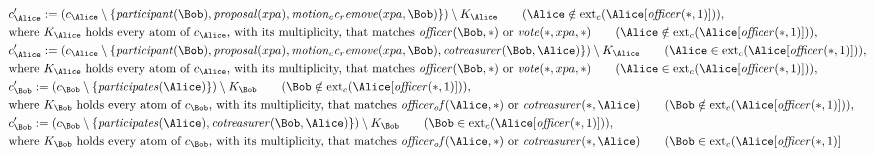 \begin{align*}
&
c'_
{
\Alice
}
 := 
(c_
{
\Alice
}
 \setminus 
\{
\mathit{
participant
}
(
\Bob
)
,
\mathit{
proposal
}
(
xpa
)
,
\mathit{
motion_cc_remove
}
(
xpa
,
\Bob
)
\}
) \setminus K_
{
\Alice
}
 \qquad (
\Alice
 \notin 
\mathrm{ext}_c(
\Alice
[
\mathit{
officer
}
(
\ast
,
1
)
]
)
)
,\\
&
\text{where } K_
{
\Alice
}
 \text{ holds every atom of } c_
{
\Alice
}
 \text{, with its multiplicity, that matches } 
\mathit{
officer
}
(
\Bob
,
\ast
)
 \text{ or } 
\mathit{
vote
}
(
\ast
,
xpa
,
\ast
)
 \qquad (
\Alice
 \notin 
\mathrm{ext}_c(
\Alice
[
\mathit{
officer
}
(
\ast
,
1
)
]
)
)
,\\
&
c'_
{
\Alice
}
 := 
(c_
{
\Alice
}
 \setminus 
\{
\mathit{
participant
}
(
\Bob
)
,
\mathit{
proposal
}
(
xpa
)
,
\mathit{
motion_cc_remove
}
(
xpa
,
\Bob
)
,
\mathit{
cotreasurer
}
(
\Bob
,
\Alice
)
\}
) \setminus K_
{
\Alice
}
 \qquad (
\Alice
 \in 
\mathrm{ext}_c(
\Alice
[
\mathit{
officer
}
(
\ast
,
1
)
]
)
)
,\\
&
\text{where } K_
{
\Alice
}
 \text{ holds every atom of } c_
{
\Alice
}
 \text{, with its multiplicity, that matches } 
\mathit{
officer
}
(
\Bob
,
\ast
)
 \text{ or } 
\mathit{
vote
}
(
\ast
,
xpa
,
\ast
)
 \qquad (
\Alice
 \in 
\mathrm{ext}_c(
\Alice
[
\mathit{
officer
}
(
\ast
,
1
)
]
)
)
,\\
&
c'_
{
\Bob
}
 := 
(c_
{
\Bob
}
 \setminus 
\{
\mathit{
participates
}
(
\Alice
)
\}
) \setminus K_
{
\Bob
}
 \qquad (
\Bob
 \notin 
\mathrm{ext}_c(
\Alice
[
\mathit{
officer
}
(
\ast
,
1
)
]
)
)
,\\
&
\text{where } K_
{
\Bob
}
 \text{ holds every atom of } c_
{
\Bob
}
 \text{, with its multiplicity, that matches } 
\mathit{
officer_of
}
(
\Alice
,
\ast
)
 \text{ or } 
\mathit{
cotreasurer
}
(
\ast
,
\Alice
)
 \qquad (
\Bob
 \notin 
\mathrm{ext}_c(
\Alice
[
\mathit{
officer
}
(
\ast
,
1
)
]
)
)
,\\
&
c'_
{
\Bob
}
 := 
(c_
{
\Bob
}
 \setminus 
\{
\mathit{
participates
}
(
\Alice
)
,
\mathit{
cotreasurer
}
(
\Bob
,
\Alice
)
\}
) \setminus K_
{
\Bob
}
 \qquad (
\Bob
 \in 
\mathrm{ext}_c(
\Alice
[
\mathit{
officer
}
(
\ast
,
1
)
]
)
)
,\\
&
\text{where } K_
{
\Bob
}
 \text{ holds every atom of } c_
{
\Bob
}
 \text{, with its multiplicity, that matches } 
\mathit{
officer_of
}
(
\Alice
,
\ast
)
 \text{ or } 
\mathit{
cotreasurer
}
(
\ast
,
\Alice
)
 \qquad (
\Bob
 \in 
\mathrm{ext}_c(
\Alice
[
\mathit{
officer
}
(
\ast
,
1
)
]

\end{align*}
